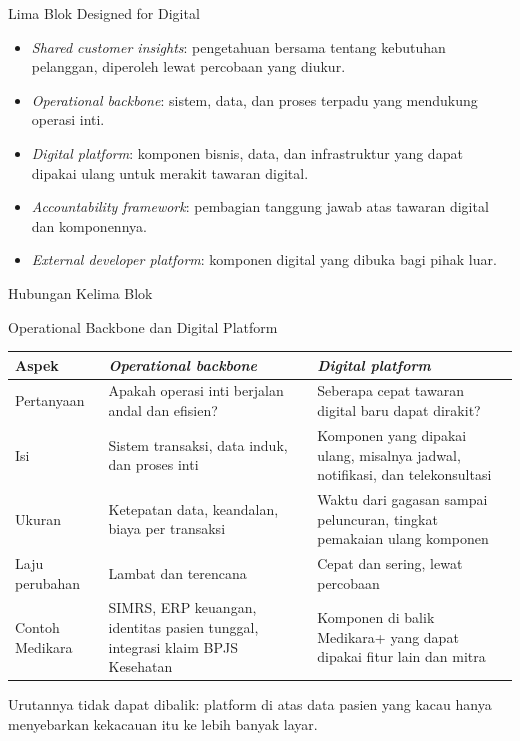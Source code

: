 \documentclass[aspectratio=169, table, 12pt]{beamer}
\begin{document}
\begin{frame}{{\Large Lima Blok Designed for Digital}}
  \vspace{6pt}
  \small
  \begin{itemize}
    \item \textit{Shared customer insights}: pengetahuan bersama tentang kebutuhan pelanggan, diperoleh
          lewat percobaan yang diukur.
    \item \textit{Operational backbone}: sistem, data, dan proses terpadu yang mendukung operasi inti.
    \item \textit{Digital platform}: komponen bisnis, data, dan infrastruktur yang dapat dipakai ulang
          untuk merakit tawaran digital.
    \item \textit{Accountability framework}: pembagian tanggung jawab atas tawaran digital dan
          komponennya.
    \item \textit{External developer platform}: komponen digital yang dibuka bagi pihak luar.
  \end{itemize}
\end{frame}

\begin{frame}{{\Large Hubungan Kelima Blok}}
  \centering
\end{frame}

\begin{frame}{{\Large Operational Backbone dan Digital Platform}}
  \scriptsize
  \begin{tabularx}{\textwidth}{l>{\raggedright\arraybackslash}X>{\raggedright\arraybackslash}X}
    \hline
    \textbf{Aspek} & \textbf{\textit{Operational backbone}} & \textbf{\textit{Digital platform}} \\
    \hline
    Pertanyaan & Apakah operasi inti berjalan andal dan efisien? &
      Seberapa cepat tawaran digital baru dapat dirakit? \\
    \hline
    Isi & Sistem transaksi, data induk, dan proses inti & Komponen yang dipakai ulang,
      misalnya jadwal, notifikasi, dan telekonsultasi \\
    \hline
    Ukuran & Ketepatan data, keandalan, biaya per transaksi & Waktu dari gagasan sampai
      peluncuran, tingkat pemakaian ulang komponen \\
    \hline
    Laju perubahan & Lambat dan terencana & Cepat dan sering, lewat percobaan \\
    \hline
    Contoh Medikara & SIMRS, ERP keuangan, identitas pasien tunggal, integrasi klaim BPJS
      Kesehatan & Komponen di balik Medikara+ yang dapat dipakai fitur lain dan mitra \\
    \hline
  \end{tabularx}

  \vspace{8pt}
  \small Urutannya tidak dapat dibalik: platform di atas data pasien yang kacau hanya menyebarkan
  kekacauan itu ke lebih banyak layar.
\end{frame}
\end{document}
